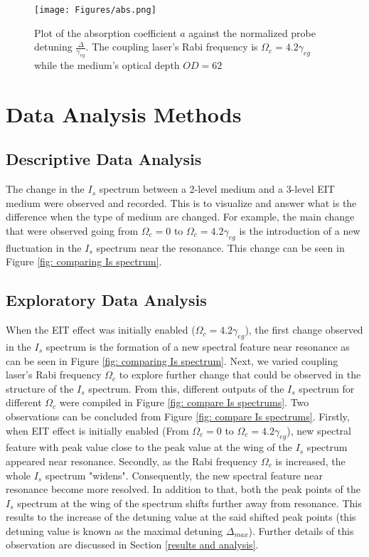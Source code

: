 \begin{figure}[h!]
    \centering
    \texttt{[image: Figures/abs.png]}
    \caption{Plot of the absorption coefficient $a$ against the normalized probe detuning $\frac{\Delta}{\gamma_{eg}}$. The coupling laser's Rabi frequency is $\Omega_{c} = 4.2\gamma_{eg}$ while the medium's optical depth $OD = 62$}
    \label{fig: abs}
\end{figure}


\section{Data Analysis Methods}
\subsection{Descriptive Data Analysis}
The change in the $I_{s}$ spectrum between a 2-level medium and a 3-level EIT medium were observed and recorded. This is to visualize and answer what is the difference when the type of medium are changed. For example, the main change that were observed going from $\Omega_{c} = 0$ to $\Omega_{c} = 4.2\gamma_{eg}$ is the introduction of a new fluctuation in the $I_{s}$ spectrum near the resonance. This change can be seen in Figure \ref{fig: comparing Is spectrum}. 

\subsection{Exploratory Data Analysis}
When the EIT effect was initially enabled ($\Omega_{c} = 4.2\gamma_{eg}$), the first change observed in the $I_{s}$ spectrum is the formation of a new spectral feature near resonance as can be seen in Figure \ref{fig: comparing Is spectrum}. Next, we varied coupling laser's Rabi frequency $\Omega_{c}$ to explore further change that could be observed in the structure of the $I_{s}$ spectrum. From this, different outputs of the $I_{s}$ spectrum for different $\Omega_{c}$ were compiled in Figure \ref{fig: compare Is spectrums}. Two observations can be concluded from Figure \ref{fig: compare Is spectrums}. Firstly, when EIT effect is initially enabled (From $\Omega_{c} = 0$ to $\Omega_{c} = 4.2\gamma_{eg}$), new spectral feature with peak value close to the peak value at the wing of the $I_{s}$ spectrum appeared near resonance. Secondly, as the Rabi frequency $\Omega_{c}$ is increased, the whole $I_{s}$ spectrum "widens". Consequently, the new spectral feature near resonance become more resolved. In addition to that, both the peak points of the $I_{s}$ spectrum at the wing of the spectrum shifts further away from resonance. This results to the increase of the detuning value at the said shifted peak points (this detuning value is known as the maximal detuning $\Delta_{max}$). Further details of this observation are discussed in Section \ref{results and analysis}.


